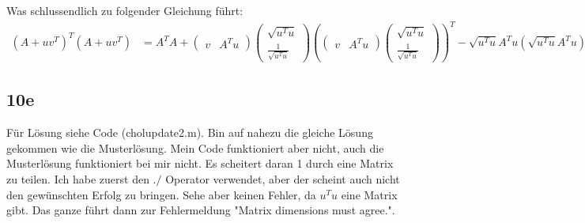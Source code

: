 \documentclass[11pt]{article}
\begin{document}
Was schlussendlich zu folgender Gleichung führt:
\begin{align*}
(A + uv^T)^T(A + uv^T) &= A^T A + \begin{pmatrix} v & A^T u \end{pmatrix} \begin{pmatrix} \sqrt{u^T u} \\ \frac{1}{\sqrt{u^T u}} \end{pmatrix} \left(\begin{pmatrix} v & A^T u \end{pmatrix} \begin{pmatrix} \sqrt{u^T u} \\ \frac{1}{\sqrt{u^T u}} \end{pmatrix} \right)^T - \sqrt{u^T u} A^T u (\sqrt{u^T u} A^T u)^T
\end{align*}

\subsection{10e}
Für Lösung siehe Code (cholupdate2.m). Bin auf nahezu die gleiche Lösung gekommen wie die Musterlösung. Mein Code funktioniert aber nicht, auch die Musterlösung funktioniert bei mir nicht. Es scheitert daran 1 durch eine Matrix zu teilen. Ich habe zuerst den $./$ Operator verwendet, aber der scheint auch nicht den gewünschten Erfolg zu bringen. Sehe aber keinen Fehler, da $u^T u$ eine Matrix gibt. Das ganze führt dann zur Fehlermeldung "Matrix dimensions must agree.".
\end{document}
